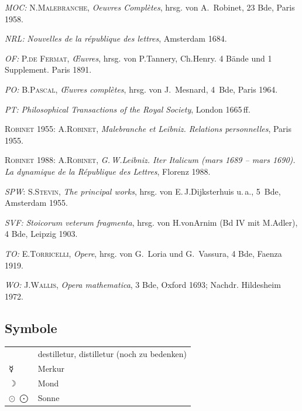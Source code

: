\textit{MOC:} N.\;\textsc{Malebranche}, \textit{Oeuvres Complètes}, hrsg. von A.~Robinet, 23 Bde, Paris 1958.\par
\textit{NRL:} \textit{Nouvelles de la république des lettres}, Amsterdam 1684.\par
\textit{OF:} \textsc{P.\;de Fermat}, \textit{Œuvres}, hrsg. von P.\;Tannery, Ch.\;Henry. 4 Bände und 1 Supplement. Paris 1891.\par
\textit{PO:} B.\;\textsc{Pascal}, \textit{Œuvres complètes}, hrsg. von J.~Mesnard, 4~Bde, Paris 1964.\par
\textit{PT:} %
\textit{Philosophical Transactions of the Royal Society}, London 1665\,ff.\par
\textsc{Robinet} 1955: A.\;\textsc{Robinet}, \textit{Malebranche et Leibniz. Relations personnelles}, Paris 1955.\par
\textsc{Robinet} 1988: A.\;\textsc{Robinet}, \textit{G.\,W.\;Leibniz. Iter Italicum (mars 1689 -- mars 1690). La dynamique de la République des Lettres}, Florenz 1988.\par
\textit{SPW}: S.\;\textsc{Stevin}, \textit{The principal works}, hrsg. von E.\,J.\;Dijksterhuis u.\,a., 5~Bde, Amsterdam 1955.\par
\textit{SVF:} \textit{Stoicorum veterum fragmenta}, hrsg. von H.\;von\;Arnim (Bd IV mit M.\;Adler), 4 Bde, Leipzig 1903.\par
\textit{TO:} E.\;\textsc{Torricelli}, \textit{Opere}, hrsg. von G.~Loria und G.~Vassura, 4 Bde, Faenza 1919.\par
\textit{WO:} J.\;\textsc{Wallis}, \textit{Opera mathematica}, 3 Bde, Oxford 1693; Nachdr. Hildesheim 1972.\par
\endgroup

\vspace{1ex}


\subsection{Symbole}
\vspace{-2.5ex}

\begin{longtable}{lp{100mm}}
\footnotesize
\Denarius 			& destilletur, distilletur (noch zu bedenken)\\
$\mercury$ 		& Merkur\\
$\rightmoon$ 		& Mond\\
$\odot$ \enskip $\bigodot$ 	& Sonne\\
\end{longtable}



